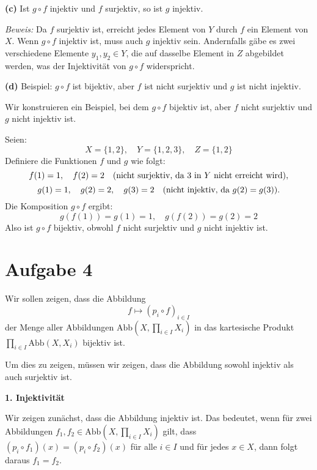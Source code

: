 \documentclass[11pt]{article}
\begin{document}
\bigskip

\textbf{(c)} Ist \( g \circ f \) injektiv und \( f \) surjektiv, so ist \( g \) injektiv.

\textit{Beweis:} Da \( f \) surjektiv ist, erreicht jedes Element von \( Y \) durch \( f \) ein Element von \( X \). Wenn \( g \circ f \) injektiv ist, muss auch \( g \) injektiv sein. Andernfalls gäbe es zwei verschiedene Elemente \( y_1, y_2 \in Y \), die auf dasselbe Element in \( Z \) abgebildet werden, was der Injektivität von \( g \circ f \) widerspricht.

\bigskip

\textbf{(d)} Beispiel: \( g \circ f \) ist bijektiv, aber \( f \) ist nicht surjektiv und \( g \) ist nicht injektiv.

Wir konstruieren ein Beispiel, bei dem \( g \circ f \) bijektiv ist, aber \( f \) nicht surjektiv und \( g \) nicht injektiv ist.

Seien:
\[
X = \{1, 2\}, \quad Y = \{1, 2, 3\}, \quad Z = \{1, 2\}
\]
Definiere die Funktionen \( f \) und \( g \) wie folgt:
\[
f(1) = 1, \quad f(2) = 2 \quad \text{(nicht surjektiv, da \( 3 \) in \( Y \) nicht erreicht wird)},
\]
\[
g(1) = 1, \quad g(2) = 2, \quad g(3) = 2 \quad \text{(nicht injektiv, da \( g(2) = g(3) \))}.
\]
Die Komposition \( g \circ f \) ergibt:
\[
g(f(1)) = g(1) = 1, \quad g(f(2)) = g(2) = 2
\]
Also ist \( g \circ f \) bijektiv, obwohl \( f \) nicht surjektiv und \( g \) nicht injektiv ist.


\section*{Aufgabe 4}

Wir sollen zeigen, dass die Abbildung
\[
f \mapsto (p_i \circ f)_{i \in I}
\]
der Menge aller Abbildungen \( \text{Abb}(X, \prod_{i \in I} X_i) \) in das kartesische Produkt \( \prod_{i \in I} \text{Abb}(X, X_i) \) bijektiv ist.

\medskip

Um dies zu zeigen, müssen wir zeigen, dass die Abbildung sowohl injektiv als auch surjektiv ist.

\textbf{1. Injektivität}

Wir zeigen zunächst, dass die Abbildung injektiv ist. Das bedeutet, wenn für zwei Abbildungen \( f_1, f_2 \in \text{Abb}(X, \prod_{i \in I} X_i) \) gilt, dass \( (p_i \circ f_1)(x) = (p_i \circ f_2)(x) \) für alle \( i \in I \) und für jedes \( x \in X \), dann folgt daraus \( f_1 = f_2 \).
\end{document}
